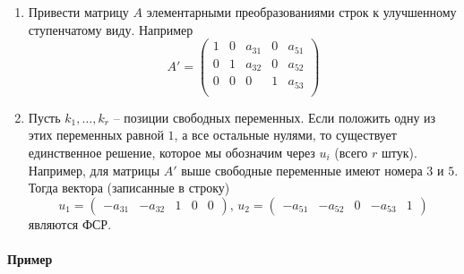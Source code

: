 \documentclass{article}
\begin{document}
\begin{enumerate}
\item Привести матрицу $A$ элементарными преобразованиями строк к улучшенному ступенчатому виду.
Например
\[
A' = 
\begin{pmatrix}
{1}&{0}&{a_{31}}&{0}&{a_{51}}\\
{0}&{1}&{a_{32}}&{0}&{a_{52}}\\
{0}&{0}&{0}&{1}&{a_{53}}\\
\end{pmatrix}
\]

\item Пусть $k_1,\ldots,k_r$ -- позиции свободных переменных.
Если положить одну из этих переменных равной $1$, а все остальные нулями, то существует единственное решение, которое мы обозначим через $u_i$ (всего $r$ штук).
Например, для матрицы $A'$ выше свободные переменные имеют номера $3$ и $5$.
Тогда вектора (записанные в строку)
\[
u_1 = 
\begin{pmatrix}
{-a_{31}}&{-a_{32}}&{1}&{0}&{0}
\end{pmatrix},\,
u_2 = 
\begin{pmatrix}
{-a_{51}}&{-a_{52}}&{0}&{-a_{53}}&{1}
\end{pmatrix}
\]
являются ФСР.
\end{enumerate}

\paragraph{Пример}
\end{document}
